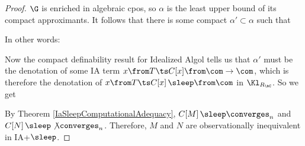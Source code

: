 \begin{proof}
  $\G$ is enriched in algebraic cpos, so $\alpha$ is the least upper bound of its compact approximants.  
  It follows that there is some compact $\alpha'\subset \alpha$ such that
  In other words:
  Now the compact definability result for Idealized Algol \cite[17]{SamsonGuyIAActive} tells us that $\alpha'$ must be the denotation of some IA term $x\from T \ts C[x] \from \com \to \com$, which is therefore the denotation of $x\from T \ts C[x]\,\sleep \from \com$ in $\Kl_{R_\bC}$.
  So we get
  By Theorem \ref{IaSleepComputationalAdequacy}, $C[M]\,\sleep\converges_n$ and $C[N]\,\sleep\not\converges_n$.  
  Therefore, $M$ and $N$ are observationally inequivalent in IA+$\sleep$.
\end{proof}
